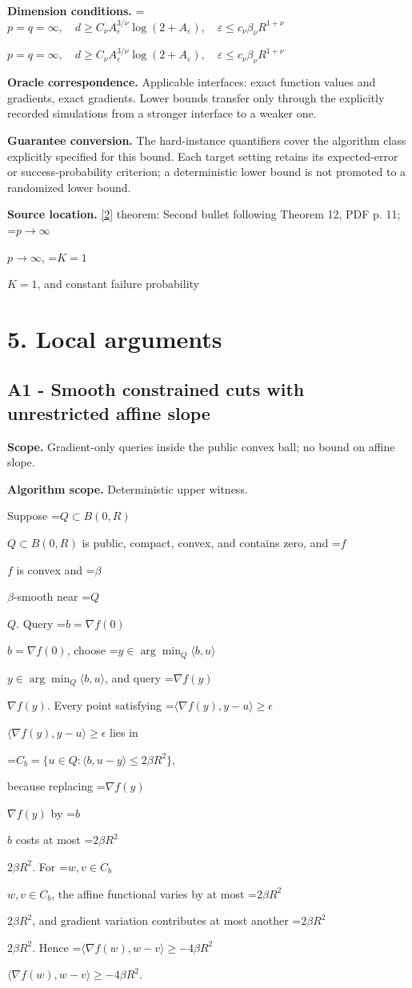 \documentclass[10pt,a4paper]{article}
\newcommand{\AtlasMath}[1]{\par\begingroup\centering\setbox0=\hbox{$\displaystyle #1$}\ifdim\wd0>1.4\linewidth\typeout{ATLAS WIDE FORMULA: \the\wd0}\fi\ifdim\wd0>\linewidth\resizebox{\linewidth}{!}{\box0}\else\box0\fi\par\endgroup}
\newcommand{\AtlasInlineMath}[1]{\begingroup\setbox0=\hbox{$#1$}\ifdim\wd0>.4\linewidth\endgroup\AtlasMath{#1}\else\endgroup$#1$\fi}
\begin{document}
\textbf{Dimension conditions.} \AtlasInlineMath{p=q=\infty,\quad d\ge C_\nu A_\varepsilon^{3/\nu}\log(2+A_\varepsilon),\quad\varepsilon\le c_\nu\beta_\nu R^{1+\nu}}

\textbf{Oracle correspondence.} Applicable interfaces: exact function values and gradients, exact gradients. Lower bounds transfer only through the explicitly recorded simulations from a stronger interface to a weaker one.

\textbf{Guarantee conversion.} The hard-instance quantifiers cover the algorithm class explicitly specified for this bound. Each target setting retains its expected-error or success-probability criterion; a deterministic lower bound is not promoted to a randomized lower bound.

\textbf{Source location.} \href{https://proceedings.mlr.press/v99/diakonikolas19c/diakonikolas19c.pdf}{[2]} theorem: Second bullet following Theorem 12, PDF p. 11; \AtlasInlineMath{p\to\infty}, \AtlasInlineMath{K=1}, and constant failure probability

\section{5. Local arguments}
\subsection{A1 - Smooth constrained cuts with unrestricted affine slope}
\textbf{Scope.} Gradient-only queries inside the public convex ball; no bound on affine slope.

\textbf{Algorithm scope.} Deterministic upper witness.

Suppose \AtlasInlineMath{Q\subset B(0,R)} is public, compact, convex, and contains zero, and \AtlasInlineMath{f} is convex and \AtlasInlineMath{\beta}-smooth near \AtlasInlineMath{Q}. Query \AtlasInlineMath{b=\nabla f(0)}, choose \AtlasInlineMath{y\in\arg\min_Q\langle b,u\rangle}, and query \AtlasInlineMath{\nabla f(y)}. Every point satisfying \AtlasInlineMath{\langle\nabla f(y),y-u\rangle\ge\epsilon} lies in

\AtlasMath{C_b=\{u\in Q:\langle b,u-y\rangle\le2\beta R^2\},}

because replacing \AtlasInlineMath{\nabla f(y)} by \AtlasInlineMath{b} costs at most \AtlasInlineMath{2\beta R^2}. For \AtlasInlineMath{w,v\in C_b}, the affine functional varies by at most \AtlasInlineMath{2\beta R^2}, and gradient variation contributes at most another \AtlasInlineMath{2\beta R^2}. Hence \AtlasInlineMath{\langle\nabla f(w),w-v\rangle\ge-4\beta R^2}.
\end{document}
